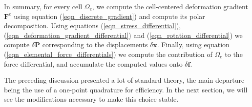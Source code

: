 In summary, for every cell $\Omega_e$, we compute the cell-centered deformation gradient $\mathbf{F}^e$ using
equation (\ref{eqn_discrete_gradient}) and compute its polar decomposition. Using equations (\ref{eqn_stress_differential}), (\ref{eqn_deformation_gradient_differential}) and
(\ref{eqn_rotation_differential}) we compute $\delta\mathbf{P}$ corresponding to the displacements $\delta\mathbf{x}$. Finally, using equation
(\ref{eqn_elemental_force_differentials}) we compute the contribution of $\Omega_e$ to the force differential, and accumulate the computed values onto $\delta\mathbf{f}$.

The preceding discussion presented a lot of standard theory, the main departure
being the use of a one-point quadrature for efficiency. In the next section, we
will see the modifications necessary to make this choice stable.
